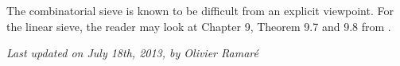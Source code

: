 The combinatorial sieve is known to be difficult from an explicit
viewpoint. For the linear sieve, the reader may look at Chapter 9,
Theorem 9.7 and 9.8 from
\cite{Nathanson*96-2}.







  
\begin{flushright}\small\sl{}   Last updated on July 18th, 2013, by Olivier Ramar\'e
 \end{flushright}















